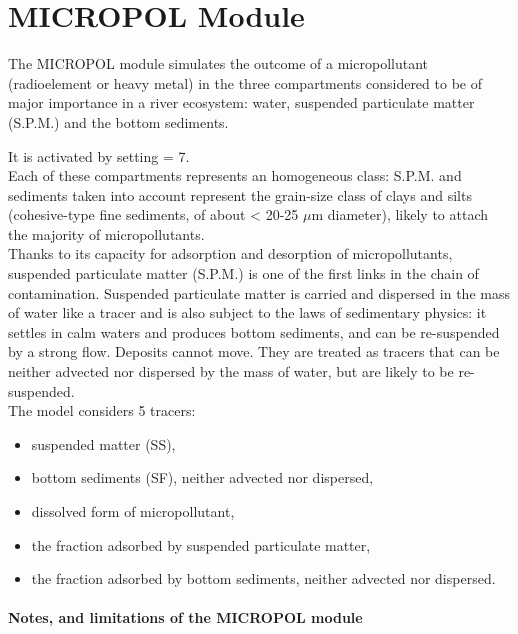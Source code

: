 \chapter{MICROPOL Module}

The MICROPOL module simulates the outcome of a micropollutant (radioelement or heavy metal)
in the three compartments considered to be of major importance in a river ecosystem:
water, suspended particulate matter (S.P.M.) and the bottom sediments.

It is activated by setting  = 7.\\

Each of these compartments represents an homogeneous class:
S.P.M. and sediments taken into account represent the grain-size class of clays and silts
(cohesive-type fine sediments, of about < 20-25 $\mu$m diameter),
likely to attach the majority of micropollutants.\\

Thanks to its capacity for adsorption and desorption of micropollutants,
suspended particulate matter (S.P.M.) is one of the first links in the chain of contamination.
Suspended particulate matter is carried and dispersed in the mass of water
like a tracer and is also subject to the laws of sedimentary physics:
it settles in calm waters and produces bottom sediments,
and can be re-suspended by a strong flow.
Deposits cannot move. They are treated as tracers that can be neither advected
nor dispersed by the mass of water, but are likely to be re-suspended.\\

The model considers 5 tracers:

\begin{itemize}
\item suspended matter (SS),
\item bottom sediments (SF), neither advected nor dispersed,
\item dissolved form of micropollutant,
\item the fraction adsorbed by suspended particulate matter,
\item the fraction adsorbed by bottom sediments, neither advected nor dispersed.
\end{itemize}

\subsubsection{Notes, and limitations of the MICROPOL module}

